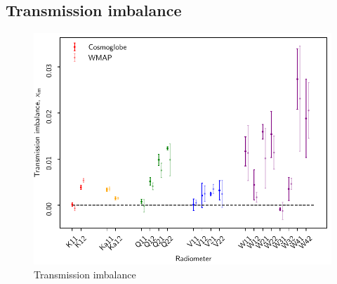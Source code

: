\documentclass[twocolumn]{../../common/aa}
\begin{document}
\subsection{Transmission imbalance}
\label{sec:xim}

\begin{figure}[t]
  	\centering
	\includegraphics[width=\linewidth]{figures/x_im_CG_v1.pdf}
	\caption{Transmission imbalance}
	\label{fig:x_im}
\end{figure}
\end{document}
